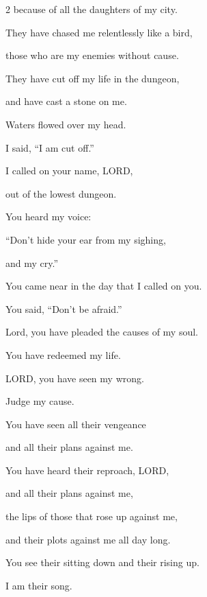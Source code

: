 \begin{multicols}{2}
	because of all the daughters of my city.

	\vspace{\baselineskip}
	
	\myverse{}They have chased me relentlessly like a bird,
	
	those who are my enemies without cause.
	
	\myverse{}They have cut off my life in the dungeon,
	
	and have cast a stone on me.
	
	\myverse{}Waters flowed over my head.
	
	I said, “I am cut off.”
	
	\vspace{\baselineskip}
	
	\myverse{}I called on your name, LORD,
	
	out of the lowest dungeon.
	
	\myverse{}You heard my voice:
	
	“Don’t hide your ear from my sighing,
	
	and my cry.”

	\vspace{\baselineskip}
	
	\myverse{}You came near in the day that I called on you.
	
	You said, “Don’t be afraid.”

	\vspace{\baselineskip}
	
	\myverse{}Lord, you have pleaded the causes of my soul.
	
	You have redeemed my life.
	
	\myverse{}LORD, you have seen my wrong.
	
	Judge my cause.
	
	\myverse{}You have seen all their vengeance
	
	and all their plans against me.
	\vspace{\baselineskip}
	
	
	\myverse{}You have heard their reproach, LORD,
	
	and all their plans against me,
	
	\myverse{}the lips of those that rose up against me,
	
	and their plots against me all day long.
	
	\myverse{}You see their sitting down and their rising up.
	
	I am their song.

	\vspace{\baselineskip}
	

\end{multicols}
